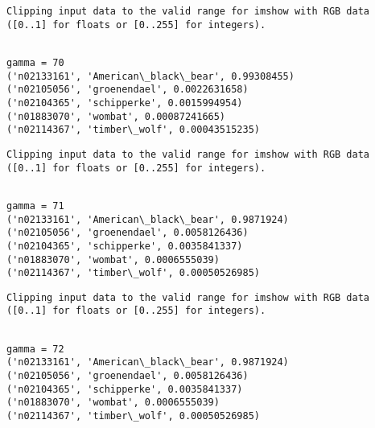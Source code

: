 \documentclass[11pt]{article}
\begin{document}
    \begin{Verbatim}[commandchars=\\\{\}]
Clipping input data to the valid range for imshow with RGB data ([0..1] for floats or [0..255] for integers).

    \end{Verbatim}

    \begin{Verbatim}[commandchars=\\\{\}]

gamma = 70
('n02133161', 'American\_black\_bear', 0.99308455)
('n02105056', 'groenendael', 0.0022631658)
('n02104365', 'schipperke', 0.0015994954)
('n01883070', 'wombat', 0.00087241665)
('n02114367', 'timber\_wolf', 0.00043515235)

    \end{Verbatim}

    \begin{Verbatim}[commandchars=\\\{\}]
Clipping input data to the valid range for imshow with RGB data ([0..1] for floats or [0..255] for integers).

    \end{Verbatim}

    \begin{Verbatim}[commandchars=\\\{\}]

gamma = 71
('n02133161', 'American\_black\_bear', 0.9871924)
('n02105056', 'groenendael', 0.0058126436)
('n02104365', 'schipperke', 0.0035841337)
('n01883070', 'wombat', 0.0006555039)
('n02114367', 'timber\_wolf', 0.00050526985)

    \end{Verbatim}

    \begin{Verbatim}[commandchars=\\\{\}]
Clipping input data to the valid range for imshow with RGB data ([0..1] for floats or [0..255] for integers).

    \end{Verbatim}

    \begin{Verbatim}[commandchars=\\\{\}]

gamma = 72
('n02133161', 'American\_black\_bear', 0.9871924)
('n02105056', 'groenendael', 0.0058126436)
('n02104365', 'schipperke', 0.0035841337)
('n01883070', 'wombat', 0.0006555039)
('n02114367', 'timber\_wolf', 0.00050526985)

    \end{Verbatim}
\end{document}
